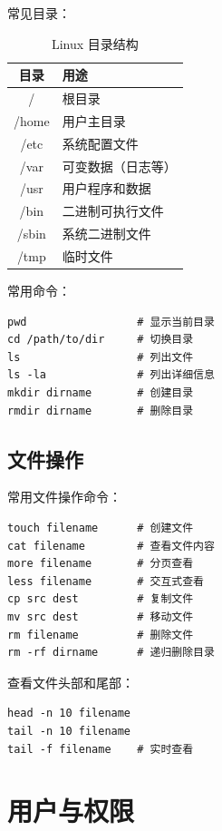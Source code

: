\documentclass[12pt,UTF8]{ctexbook}
\begin{document}
常见目录：
\begin{table}[htbp]
    \centering
    \caption{Linux 目录结构}
    \begin{tabular}{|c|p{8cm}|}
        \hline
        \textbf{目录} & \textbf{用途} \\
        \hline
        / & 根目录 \\
        \hline
        /home & 用户主目录 \\
        \hline
        /etc & 系统配置文件 \\
        \hline
        /var & 可变数据（日志等） \\
        \hline
        /usr & 用户程序和数据 \\
        \hline
        /bin & 二进制可执行文件 \\
        \hline
        /sbin & 系统二进制文件 \\
        \hline
        /tmp & 临时文件 \\
        \hline
    \end{tabular}
\end{table}

常用命令：
\begin{verbatim}
pwd                 # 显示当前目录
cd /path/to/dir     # 切换目录
ls                  # 列出文件
ls -la              # 列出详细信息
mkdir dirname       # 创建目录
rmdir dirname       # 删除目录
\end{verbatim}

\section{文件操作}
\label{sec:file_operations}

常用文件操作命令：
\begin{verbatim}
touch filename      # 创建文件
cat filename        # 查看文件内容
more filename       # 分页查看
less filename       # 交互式查看
cp src dest         # 复制文件
mv src dest         # 移动文件
rm filename         # 删除文件
rm -rf dirname      # 递归删除目录
\end{verbatim}

查看文件头部和尾部：
\begin{verbatim}
head -n 10 filename
tail -n 10 filename
tail -f filename    # 实时查看
\end{verbatim}

\chapter{用户与权限}
\label{chap:users_and_permissions}
\end{document}

